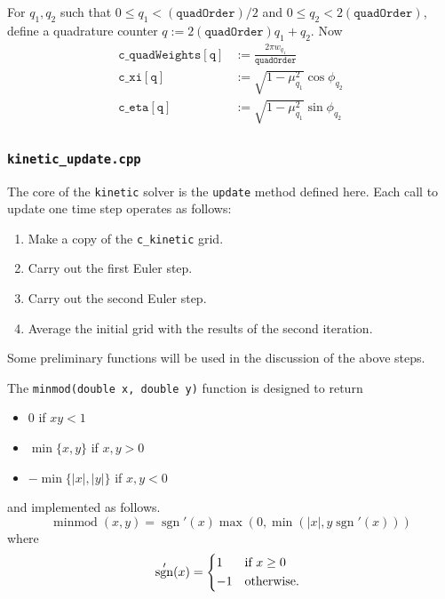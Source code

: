 \documentclass{article}
\newcommand{\quadorder}{\ensuremath{\mathtt{quadOrder}}\xspace}
\newcommand{\assign}{\ensuremath{\mathrel{\texttt{:=}}}}
\DeclareMathOperator{\minmod}{minmod}
\DeclareMathOperator{\sgn}{sgn}
\newcommand{\kinetic}{\texttt{kinetic}\xspace}
\begin{document}
For $q_1,q_2$ such that $0 \leq q_1 < (\quadorder) / 2$ and
$0 \leq q_2 < 2(\quadorder)$, define a quadrature counter
$q \assign 2(\quadorder)q_1 + q_2$. Now 
\begin{align}
    \mathtt{c\_quadWeights[q]} &\assign \frac{2\pi w_{q_1}}{\quadorder} \\
    \mathtt{c\_xi[q]} &\assign \sqrt{1 - \mu_{q_1}^2} \cos \phi_{q_2} \\
    \mathtt{c\_eta[q]} &\assign \sqrt{1 - \mu_{q_1}^2} \sin \phi_{q_2}
\end{align}

\subsubsection{\texttt{kinetic\_update.cpp}}
\label{src:kinetic_update.cpp}
The core of the \kinetic solver is the \texttt{update} method defined here. Each
call to update one time step operates as follows:
\begin{enumerate}
    \item Make a copy of the \texttt{c\_kinetic} grid.
    \item Carry out the first Euler step.
    \item Carry out the second Euler step.
    \item Average the initial grid with the results of the second iteration.
\end{enumerate}
Some preliminary functions will be used in the discussion of the above steps.


The \texttt{minmod(double x, double y)} function is designed to return
\begin{itemize}
    \item 0 if $xy < 1$
    \item $\min\{x, y\}$ if $x,y > 0$
    \item $-\min\{|x|, |y|\}$ if $x,y < 0$
\end{itemize}
and implemented as follows.
\begin{equation}
    \minmod (x, y) = \sgn'(x) \max\left(0, \min\left(|x|, y \sgn'(x)\right)\right)
\end{equation}
where
\begin{equation}
    \sgn'(x) =
    \begin{dcases*}
        1  & if $x \geq 0$ \\
        -1 & otherwise.
    \end{dcases*}
\end{equation}
\end{document}
